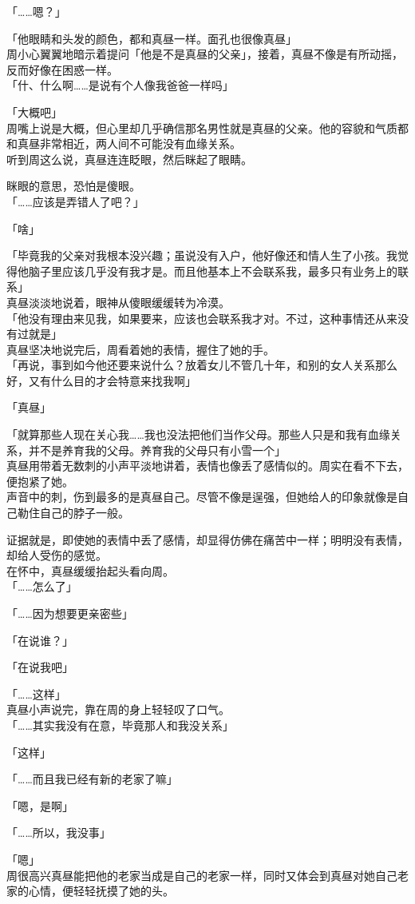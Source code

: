 「……嗯？」

「他眼睛和头发的颜色，都和真昼一样。面孔也很像真昼」\\

周小心翼翼地暗示着提问「他是不是真昼的父亲」，接着，真昼不像是有所动摇，反而好像在困惑一样。\\

「什、什么啊……是说有个人像我爸爸一样吗」

「大概吧」\\

周嘴上说是大概，但心里却几乎确信那名男性就是真昼的父亲。他的容貌和气质都和真昼非常相近，两人间不可能没有血缘关系。\\

听到周这么说，真昼连连眨眼，然后眯起了眼睛。

眯眼的意思，恐怕是傻眼。\\

「……应该是弄错人了吧？」

「啥」

「毕竟我的父亲对我根本没兴趣；虽说没有入户，他好像还和情人生了小孩。我觉得他脑子里应该几乎没有我才是。而且他基本上不会联系我，最多只有业务上的联系」\\

真昼淡淡地说着，眼神从傻眼缓缓转为冷漠。\\

「他没有理由来见我，如果要来，应该也会联系我才对。不过，这种事情还从来没有过就是」\\

真昼坚决地说完后，周看着她的表情，握住了她的手。\\

「再说，事到如今他还要来说什么？放着女儿不管几十年，和别的女人关系那么好，又有什么目的才会特意来找我啊」

「真昼」

「就算那些人现在关心我……我也没法把他们当作父母。那些人只是和我有血缘关系，并不是养育我的父母。养育我的父母只有小雪一个」\\

真昼用带着无数刺的小声平淡地讲着，表情也像丢了感情似的。周实在看不下去，便抱紧了她。\\

声音中的刺，伤到最多的是真昼自己。尽管不像是逞强，但她给人的印象就像是自己勒住自己的脖子一般。

证据就是，即使她的表情中丢了感情，却显得仿佛在痛苦中一样；明明没有表情，却给人受伤的感觉。\\

在怀中，真昼缓缓抬起头看向周。\\

「……怎么了」

「……因为想要更亲密些」

「在说谁？」

「在说我吧」

「……这样」\\

真昼小声说完，靠在周的身上轻轻叹了口气。\\

「……其实我没有在意，毕竟那人和我没关系」

「这样」

「……而且我已经有新的老家了嘛」

「嗯，是啊」

「……所以，我没事」

「嗯」\\

周很高兴真昼能把他的老家当成是自己的老家一样，同时又体会到真昼对她自己老家的心情，便轻轻抚摸了她的头。
